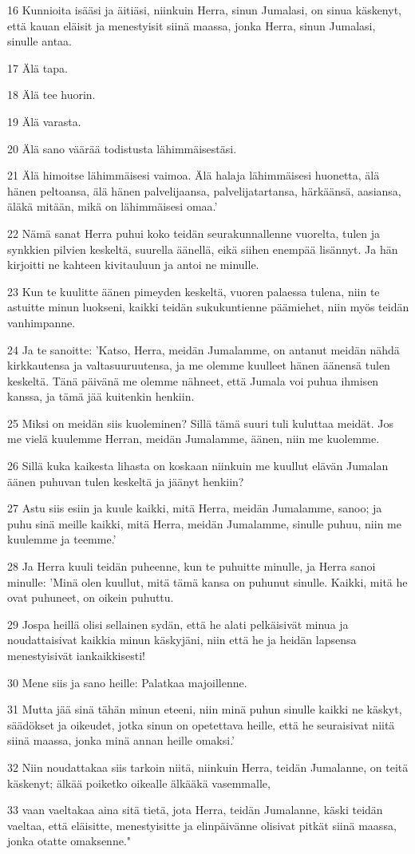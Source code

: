 \par 16 Kunnioita isääsi ja äitiäsi, niinkuin Herra, sinun Jumalasi, on sinua käskenyt, että kauan eläisit ja menestyisit siinä maassa, jonka Herra, sinun Jumalasi, sinulle antaa.
\par 17 Älä tapa.
\par 18 Älä tee huorin.
\par 19 Älä varasta.
\par 20 Älä sano väärää todistusta lähimmäisestäsi.
\par 21 Älä himoitse lähimmäisesi vaimoa. Älä halaja lähimmäisesi huonetta, älä hänen peltoansa, älä hänen palvelijaansa, palvelijatartansa, härkäänsä, aasiansa, äläkä mitään, mikä on lähimmäisesi omaa.'
\par 22 Nämä sanat Herra puhui koko teidän seurakunnallenne vuorelta, tulen ja synkkien pilvien keskeltä, suurella äänellä, eikä siihen enempää lisännyt. Ja hän kirjoitti ne kahteen kivitauluun ja antoi ne minulle.
\par 23 Kun te kuulitte äänen pimeyden keskeltä, vuoren palaessa tulena, niin te astuitte minun luokseni, kaikki teidän sukukuntienne päämiehet, niin myös teidän vanhimpanne.
\par 24 Ja te sanoitte: 'Katso, Herra, meidän Jumalamme, on antanut meidän nähdä kirkkautensa ja valtasuuruutensa, ja me olemme kuulleet hänen äänensä tulen keskeltä. Tänä päivänä me olemme nähneet, että Jumala voi puhua ihmisen kanssa, ja tämä jää kuitenkin henkiin.
\par 25 Miksi on meidän siis kuoleminen? Sillä tämä suuri tuli kuluttaa meidät. Jos me vielä kuulemme Herran, meidän Jumalamme, äänen, niin me kuolemme.
\par 26 Sillä kuka kaikesta lihasta on koskaan niinkuin me kuullut elävän Jumalan äänen puhuvan tulen keskeltä ja jäänyt henkiin?
\par 27 Astu siis esiin ja kuule kaikki, mitä Herra, meidän Jumalamme, sanoo; ja puhu sinä meille kaikki, mitä Herra, meidän Jumalamme, sinulle puhuu, niin me kuulemme ja teemme.'
\par 28 Ja Herra kuuli teidän puheenne, kun te puhuitte minulle, ja Herra sanoi minulle: 'Minä olen kuullut, mitä tämä kansa on puhunut sinulle. Kaikki, mitä he ovat puhuneet, on oikein puhuttu.
\par 29 Jospa heillä olisi sellainen sydän, että he alati pelkäisivät minua ja noudattaisivat kaikkia minun käskyjäni, niin että he ja heidän lapsensa menestyisivät iankaikkisesti!
\par 30 Mene siis ja sano heille: Palatkaa majoillenne.
\par 31 Mutta jää sinä tähän minun eteeni, niin minä puhun sinulle kaikki ne käskyt, säädökset ja oikeudet, jotka sinun on opetettava heille, että he seuraisivat niitä siinä maassa, jonka minä annan heille omaksi.'
\par 32 Niin noudattakaa siis tarkoin niitä, niinkuin Herra, teidän Jumalanne, on teitä käskenyt; älkää poiketko oikealle älkääkä vasemmalle,
\par 33 vaan vaeltakaa aina sitä tietä, jota Herra, teidän Jumalanne, käski teidän vaeltaa, että eläisitte, menestyisitte ja elinpäivänne olisivat pitkät siinä maassa, jonka otatte omaksenne."

